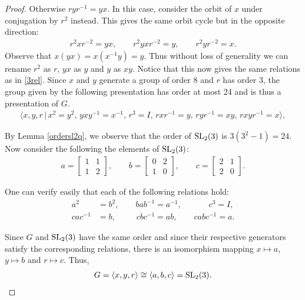 \begin{proof}
Otherwise $r y r^{-1} = yx$. In this case, consider the orbit of $x$ under conjugation by $r^2$ instead. This gives the same orbit cycle but in the opposite direction:
\begin{align*} r^2 x r^{-2} = yx, \qquad r^2 yx r^{-2} = y, \qquad r^2 y r^{-2} = x.
\end{align*}
Observe that $x(yx) = x (x^{-1} y) = y$. Thus without loss of generality we can rename $r^2$ as $r$, $yx$ as $y$ and $y$ as $xy$. Notice that this now gives the same relations as in \eqref{3rel}. Since $x$ and $y$ generate a group of order 8 and $r$ has order 3, the group given by the following presentation has order at most 24 and is thus a presentation of $G$. 
\begin{align*} \langle x, y, r \, |  \, x^2= y^2, \, y x y^{-1} = x^{-1}, \, r^3 = I, \, r x r^{-1} = y, \, r y r^{-1} = xy, \, r xy r^{-1} = x \rangle,
\end{align*}

By Lemma \ref{ordersl2q}, we observe that the order of $\operatorname{SL}_2(3)$ is $3(3^2-1) = 24$. Now consider the following the elements of $\operatorname{SL}_2(3)$:
\begin{align*} a = \begin{bmatrix} 1 & 1 \\ 1 & 2 \end{bmatrix}, \qquad b = \begin{bmatrix} 0 & 2 \\ 1 & 0 \end{bmatrix}, \qquad c = \begin{bmatrix} 2 & 1 \\ 2 & 0 \end{bmatrix}.
\end{align*}

One can verify easily that each of the following relations hold:
\begin{align*} a^2 &= b^2, \qquad b a b^{-1} = a^{-1}, \qquad \quad \; c^3 = I, 
\\ c a c^{-1} &= b,  \qquad \; \: c b c^{-1} = ab, \qquad \! c ab c^{-1} = a.
\end{align*}

Since $G$ and $\operatorname{SL}_2(3)$ have the same order and since their respective generators satisfy the corresponding relations, there is an isomorphism mapping $x \mapsto a$, $y \mapsto b$ and $r \mapsto c$. Thus,
\begin{align*} G = \langle x, y, r \rangle \cong \langle a, b, c \rangle = \operatorname{SL}_2(3). 
\end{align*} 
\end{proof}


